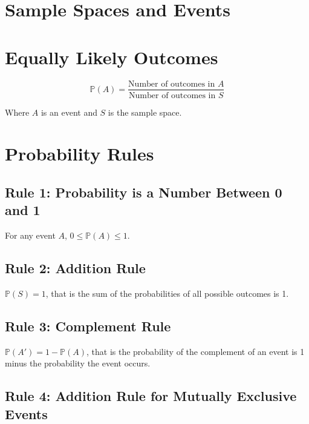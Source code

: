 \documentclass[12pt letter]{report}
\begin{document}
\section{Sample Spaces and Events}




\section{Equally Likely Outcomes}

\[
  \mathbb{P} \left( A \right) = \frac{\text{Number of outcomes in }A}{\text{Number of outcomes in } S}
\]

Where $A$ is an event and $S$ is the sample space.

\section{Probability Rules}

\subsection{Rule 1: Probability is a Number Between 0 and 1}

For any event $A$, $0 \le \mathbb{P} \left( A \right) \le 1$.


\subsection{Rule 2: Addition Rule}

$\mathbb{P} \left( S \right) = 1 $, that is the sum of the probabilities of all possible outcomes is 1.

\subsection{Rule 3: Complement Rule}

$\mathbb{P} \left( A' \right) = 1 - \mathbb{P} \left( A \right)  $, that is the probability of the complement of an event is 1 minus the
probability the event occurs.


\subsection{Rule 4: Addition Rule for Mutually Exclusive Events}
\end{document}
